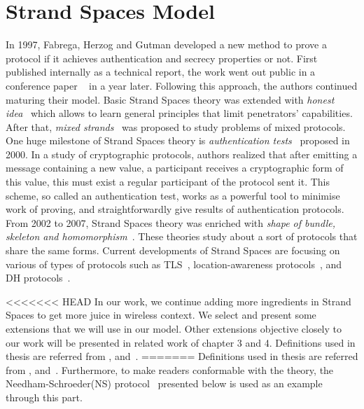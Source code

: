 
\chapter{Strand Spaces Model} %

\label{Strand Spaces Model} %


In 1997, Fabrega, Herzog and Gutman developed a new method to prove a protocol if it achieves authentication and secrecy properties or not. First published internally as a technical report, the work went out public in a conference paper ~\cite{674832} in a year later. Following this approach, the authors continued maturing their model. Basic Strand Spaces theory was extended with \emph{honest idea}~\cite{Thayer:1998:HIS:794198.795096} which allows to learn general principles that limit penetrators' capabilities. After that, \emph{mixed strands}~\cite{Thayer:1999:MSS:794199.795113} was proposed to study problems of mixed protocols. One huge milestone of Strand Spaces theory is \emph{authentication tests}~\cite{Guttman:2002:ATS:568264.568267} proposed in 2000. In a study of cryptographic protocols, authors realized that after emitting a message containing a new value, a participant receives a cryptographic form of this value, this must exist a regular participant of the protocol sent it. This scheme, so called an authentication test, works as a powerful tool to minimise work of proving, and straightforwardly give results of authentication protocols. From 2002 to 2007, Strand Spaces theory was enriched with \emph{shape of bundle, skeleton and homomorphism}~\cite{Doghmi:2007:SHS:1230146.1230260}. These theories study about a sort of protocols that share the same forms. Current developments of Strand Spaces are focusing on various of types of protocols such as TLS~\cite{Kamil:2011:ATS:2590701.2590707}, location-awareness protocols~\cite{Thayer:2010aa}, and DH protocols~\cite{1212716}. 

<<<<<<< HEAD
In our work, we continue adding more ingredients in Strand Spaces to get more juice in wireless context. We select and present some extensions that we will use in our model. Other extensions objective closely to our work will be presented in related work of chapter 3 and 4. Definitions used in thesis are referred from \cite{674832}, \cite{Guttman:2002:ATS:568264.568267} and~\cite{Doghmi:2007:SHS:1230146.1230260}. 
=======
Definitions used in thesis are referred from \cite{674832}, \cite{Guttman:2002:ATS:568264.568267} and~\cite{Doghmi:2007:SHS:1230146.1230260}. Furthermore, to make readers conformable with the theory, the Needham-Schroeder(NS) protocol~\cite{Needham:1978:UEA:359657.359659} presented below is used as an example through this part. 

